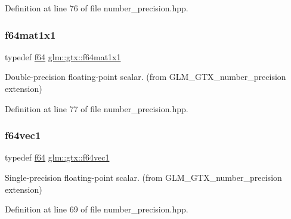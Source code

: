 Definition at line 76 of file number\+\_\+precision.\+hpp.

\mbox{\label{group__gtx__number__precision_ga710a5952d78b22635c71c5fc2c0a3319}} 
\subsubsection{\texorpdfstring{f64mat1x1}{f64mat1x1}}
{\footnotesize\ttfamily typedef \hyperlink{group__gtc__type__precision_ga2bba392e555124b36cde6abba349bab3}{f64} \hyperlink{group__gtx__number__precision_ga710a5952d78b22635c71c5fc2c0a3319}{glm\+::gtx\+::f64mat1x1}}



Double-\/precision floating-\/point scalar. (from G\+L\+M\+\_\+\+G\+T\+X\+\_\+number\+\_\+precision extension) 



Definition at line 77 of file number\+\_\+precision.\+hpp.

\mbox{\label{group__gtx__number__precision_ga44336a26c958d66efdfb5a6c114c538e}} 
\subsubsection{\texorpdfstring{f64vec1}{f64vec1}}
{\footnotesize\ttfamily typedef \hyperlink{group__gtc__type__precision_ga2bba392e555124b36cde6abba349bab3}{f64} \hyperlink{group__gtx__number__precision_ga44336a26c958d66efdfb5a6c114c538e}{glm\+::gtx\+::f64vec1}}



Single-\/precision floating-\/point scalar. (from G\+L\+M\+\_\+\+G\+T\+X\+\_\+number\+\_\+precision extension) 



Definition at line 69 of file number\+\_\+precision.\+hpp.

\mbox{\label{group__gtx__number__precision_ga807d7e5f24e981b1575bd40ca159781d}} 
